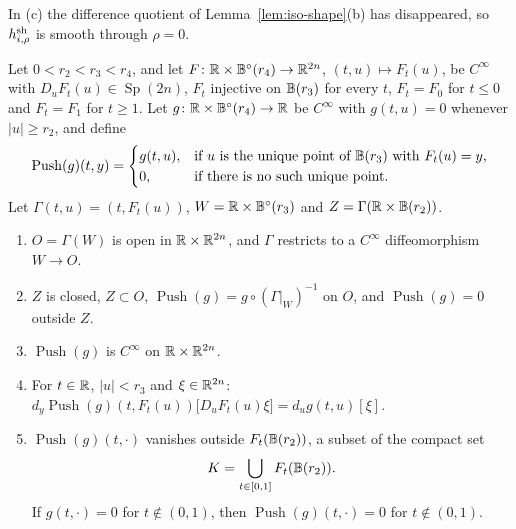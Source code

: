In (c) the difference quotient of Lemma~\ref{lem:iso-shape}(b) has disappeared, so $h^{\rm sh}_{i,\rho}$ is smooth through $\rho=0$.

\begin{lemma}\label{lem:iso-pushforward}
Let $0<r_2<r_3<r_4$, and let $F\colon\mathbb{R}\times\mathbb{B}^\circ(r_4)\to\mathbb{R}^{2n}$, $(t,u)\mapsto F_t(u)$, be $C^\infty$ with
$D_uF_t(u)\in\operatorname{Sp}(2n)$, $F_t$ injective on $\mathbb{B}(r_3)$ for every $t$, $F_t=F_0$ for $t\le0$ and $F_t=F_1$ for $t\ge1$.
Let $g\colon\mathbb{R}\times\mathbb{B}^\circ(r_4)\to\mathbb{R}$ be $C^\infty$ with $g(t,u)=0$ whenever $|u|\ge r_2$, and define
\[
 \operatorname{Push}(g)(t,y)=\begin{cases}g(t,u),&\text{if $u$ is the unique point of $\mathbb{B}(r_3)$ with $F_t(u)=y$,}\\
 0,&\text{if there is no such unique point.}\end{cases}
\]
Let $\Gamma(t,u)=(t,F_t(u))$, $W=\mathbb{R}\times\mathbb{B}^\circ(r_3)$ and $Z=\Gamma(\mathbb{R}\times\mathbb{B}(r_2))$.
\begin{enumerate}[label=(\alph*)]
\item $O=\Gamma(W)$ is open in $\mathbb{R}\times\mathbb{R}^{2n}$, and $\Gamma$ restricts to a $C^\infty$ diffeomorphism $W\to O$.
\item $Z$ is closed, $Z\subset O$, $\operatorname{Push}(g)=g\circ(\Gamma|_W)^{-1}$ on $O$, and $\operatorname{Push}(g)=0$ outside $Z$.
\item $\operatorname{Push}(g)$ is $C^\infty$ on $\mathbb{R}\times\mathbb{R}^{2n}$.
\item For $t\in\mathbb{R}$, $|u|<r_3$ and $\xi\in\mathbb{R}^{2n}$:
 $d_y\operatorname{Push}(g)(t,F_t(u))\big[D_uF_t(u)\xi\big]=d_ug(t,u)[\xi]$.
\item $\operatorname{Push}(g)(t,\cdot)$ vanishes outside $F_t(\mathbb{B}(r_2))$, a subset of the compact set
 \[
  K=\bigcup_{t\in[0,1]}F_t(\mathbb{B}(r_2)).
 \]
 If $g(t,\cdot)=0$ for $t\notin(0,1)$, then $\operatorname{Push}(g)(t,\cdot)=0$ for
 $t\notin(0,1)$.
\end{enumerate}
\end{lemma}

